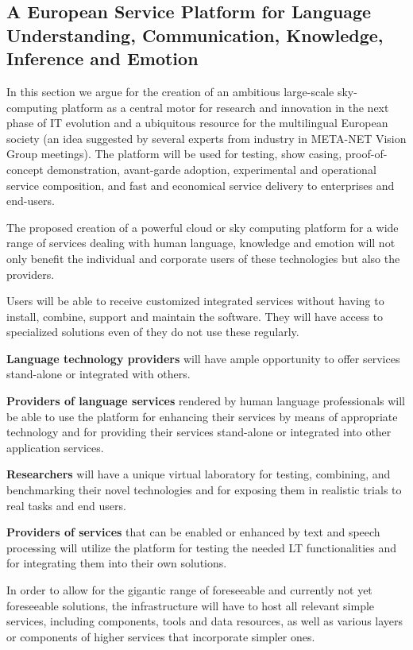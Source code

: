 \documentclass[10pt, plain]{../../metanetpaper}
\begin{document}
\begin{multicols}{2}
\subsection{A European Service Platform for Language Understanding, Communication, Knowledge, Inference and Emotion}
\label{sec:europ-service-platform}

In this section we argue for the creation of an ambitious large-scale sky-computing platform as a central motor for research and innovation in the next phase of IT evolution and a ubiquitous resource for the multilingual European society (an idea suggested by several experts from industry in META-NET Vision Group meetings). The platform will be used for testing, show casing, proof-of-concept demonstration, avant-garde adoption, experimental and operational service composition, and fast and economical service delivery to enterprises and end-users.
 
The proposed creation of a powerful cloud or sky computing platform for a wide range of services dealing with human language, knowledge and emotion will not only benefit the individual and corporate users of these technologies but also the providers.
 
Users will be able to receive customized integrated services without having to install, combine, support and maintain the software. They will have access to specialized solutions even of they do not use these regularly. 
 
\textbf{Language technology providers} will have ample opportunity to offer services stand-alone or integrated with others.
 
\textbf{Providers of language services} rendered by human language professionals will be able to use the platform for enhancing their services by means of appropriate technology and for providing their services stand-alone or integrated into other application services.
 
\textbf{Researchers} will have a unique virtual laboratory for testing, combining, and benchmarking their novel technologies and for exposing them in realistic trials to real tasks and end users.
 
\textbf{Providers of services} that can be enabled or enhanced by text and speech processing will utilize the platform for testing the needed LT functionalities
and for integrating them into their own solutions.
 
In order to allow for the gigantic range of foreseeable and currently not yet foreseeable solutions, the infrastructure will have to host all relevant simple services, including components, tools and data resources, as well as various layers or components of higher services that incorporate simpler ones.
 

\end{multicols}
\end{document}
